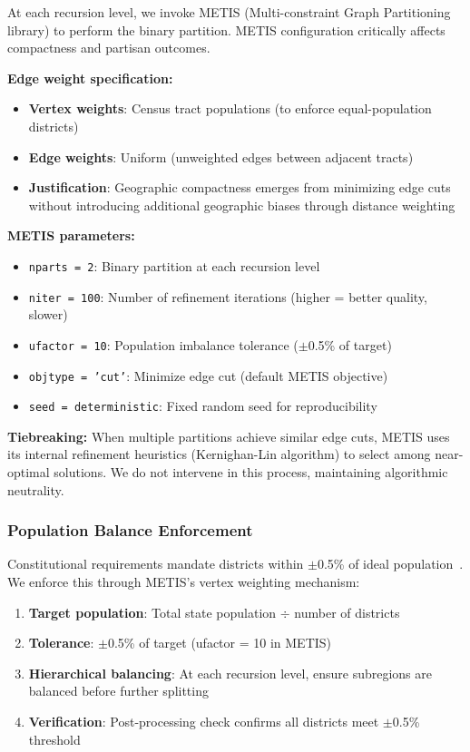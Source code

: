 At each recursion level, we invoke METIS (Multi-constraint Graph Partitioning library) to perform the binary partition. METIS configuration critically affects compactness and partisan outcomes.

\textbf{Edge weight specification:}
\begin{itemize}
    \item \textbf{Vertex weights}: Census tract populations (to enforce equal-population districts)
    \item \textbf{Edge weights}: Uniform (unweighted edges between adjacent tracts)
    \item \textbf{Justification}: Geographic compactness emerges from minimizing edge cuts without introducing additional geographic biases through distance weighting
\end{itemize}

\textbf{METIS parameters:}
\begin{itemize}
    \item \texttt{nparts = 2}: Binary partition at each recursion level
    \item \texttt{niter = 100}: Number of refinement iterations (higher = better quality, slower)
    \item \texttt{ufactor = 10}: Population imbalance tolerance ($\pm$0.5\% of target)
    \item \texttt{objtype = 'cut'}: Minimize edge cut (default METIS objective)
    \item \texttt{seed = deterministic}: Fixed random seed for reproducibility
\end{itemize}

\textbf{Tiebreaking:} When multiple partitions achieve similar edge cuts, METIS uses its internal refinement heuristics (Kernighan-Lin algorithm) to select among near-optimal solutions. We do not intervene in this process, maintaining algorithmic neutrality.

\subsubsection{Population Balance Enforcement}

Constitutional requirements mandate districts within $\pm$0.5\% of ideal population~\cite{karcher1993right}. We enforce this through METIS's vertex weighting mechanism:

\begin{enumerate}
    \item \textbf{Target population}: Total state population $\div$ number of districts
    \item \textbf{Tolerance}: $\pm$0.5\% of target (ufactor = 10 in METIS)
    \item \textbf{Hierarchical balancing}: At each recursion level, ensure subregions are balanced before further splitting
    \item \textbf{Verification}: Post-processing check confirms all districts meet $\pm$0.5\% threshold
\end{enumerate}

